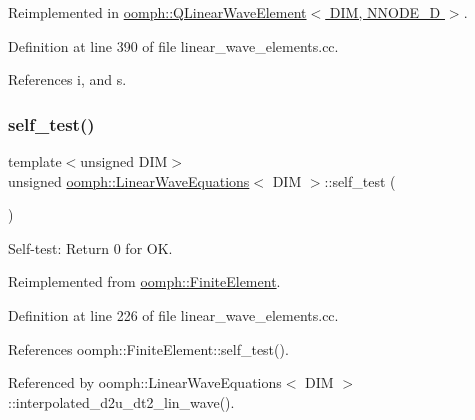 Reimplemented in \hyperlink{classoomph_1_1QLinearWaveElement_af991bd517d135fe1320074b28ed84b02}{oomph\+::\+Q\+Linear\+Wave\+Element$<$ D\+I\+M, N\+N\+O\+D\+E\+\_\+D $>$}.



Definition at line 390 of file linear\+\_\+wave\+\_\+elements.\+cc.



References i, and s.

\mbox{\label{classoomph_1_1LinearWaveEquations_a2e4ced01331ace59c6d8fe95a756ca73}} 
\subsubsection{\texorpdfstring{self\+\_\+test()}{self\_test()}}
{\footnotesize\ttfamily template$<$unsigned D\+IM$>$ \\
unsigned \hyperlink{classoomph_1_1LinearWaveEquations}{oomph\+::\+Linear\+Wave\+Equations}$<$ D\+IM $>$\+::self\+\_\+test (\begin{DoxyParamCaption}{ }\end{DoxyParamCaption})\hspace{0.3cm}{\ttfamily [virtual]}}



Self-\/test\+: Return 0 for OK. 



Reimplemented from \hyperlink{classoomph_1_1FiniteElement_af94c5a5e22175d5420b33b3b79e46ed3}{oomph\+::\+Finite\+Element}.



Definition at line 226 of file linear\+\_\+wave\+\_\+elements.\+cc.



References oomph\+::\+Finite\+Element\+::self\+\_\+test().



Referenced by oomph\+::\+Linear\+Wave\+Equations$<$ D\+I\+M $>$\+::interpolated\+\_\+d2u\+\_\+dt2\+\_\+lin\+\_\+wave().

\mbox{\label{classoomph_1_1LinearWaveEquations_aeca44d03c936545d7641f41ac977e3f3}} 
